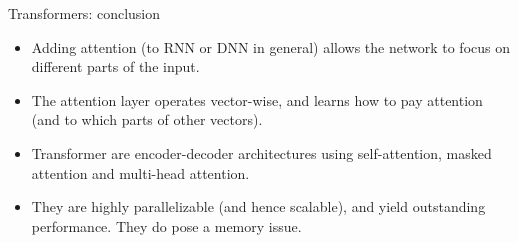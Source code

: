 \documentclass[aspectratio=169]{beamer}
\begin{document}
\begin{frame}{Transformers: conclusion}
 \begin{itemize}
  \item Adding attention (to RNN or DNN in general) allows the network to focus on different parts of the input.\vspace{3mm}
  \item The attention layer operates vector-wise, and learns how to pay attention (and to which parts of other vectors).\vspace{3mm}
  \item Transformer are encoder-decoder architectures using self-attention, masked attention and multi-head attention.\vspace{3mm}
  \item They are highly parallelizable (and hence scalable), and yield outstanding performance. They do pose a memory issue.
 \end{itemize}
\end{frame}
\end{document}
